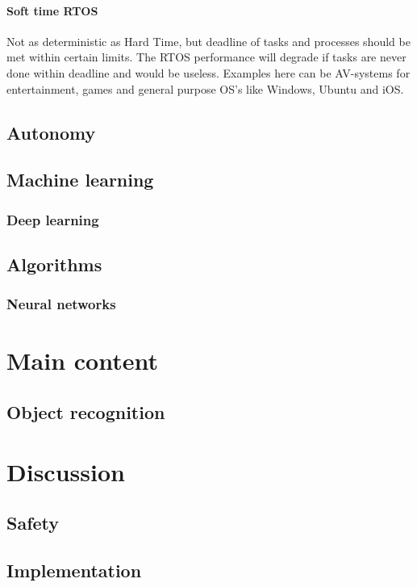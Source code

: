 \documentclass[conference]{IEEEtran}
\begin{document}
		 \paragraph{Soft time RTOS}
		 Not as deterministic as Hard Time, but deadline of tasks and processes should be met within
		 certain limits. The RTOS performance will degrade if tasks are never done within deadline and
		 would be useless. Examples here can be AV-systems for entertainment, games and general purpose
		 OS's like Windows, Ubuntu and iOS.
 \subsection{Autonomy}
 \subsection{Machine learning}
	 \subsubsection{Deep learning}
 \subsection{Algorithms}
	 \subsubsection{Neural networks}

\section{Main content} %
 \subsection{Object recognition}


\section{Discussion}
 \subsection{Safety}
 \subsection{Implementation}
\end{document}
